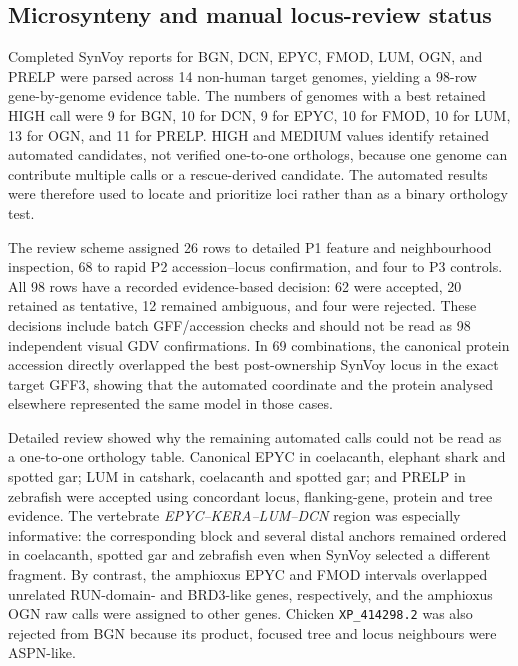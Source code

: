 \subsection{Microsynteny and manual locus-review status}
\label{subsec:results-synteny}

Completed SynVoy reports for BGN, DCN, EPYC, FMOD, LUM, OGN, and PRELP were
parsed across 14 non-human target genomes, yielding a 98-row gene-by-genome
evidence table. The numbers of genomes with a best retained HIGH call were 9
for BGN, 10 for DCN, 9 for EPYC, 10 for FMOD, 10 for LUM, 13 for OGN, and 11
for PRELP. HIGH and MEDIUM values identify retained automated candidates, not
verified one-to-one orthologs, because one genome can contribute multiple calls
or a rescue-derived candidate. The automated results were therefore used to
locate and prioritize loci rather than as a binary orthology test.

The review scheme assigned 26 rows to detailed P1 feature and neighbourhood
inspection, 68 to rapid P2 accession--locus confirmation, and four to P3
controls. All 98 rows have a recorded evidence-based decision: 62 were
accepted, 20 retained as tentative, 12 remained ambiguous, and four were
rejected. These decisions include batch GFF/accession checks and should not be
read as 98 independent visual GDV confirmations. In 69 combinations,
the canonical protein accession directly overlapped the best post-ownership
SynVoy locus in the exact target GFF3, showing that the automated coordinate
and the protein analysed elsewhere represented the same model in those cases.

Detailed review showed why the remaining automated calls could not be read as
a one-to-one orthology table. Canonical EPYC in coelacanth, elephant shark and
spotted gar; LUM in catshark, coelacanth and spotted gar; and PRELP in zebrafish
were accepted using concordant locus, flanking-gene, protein and tree evidence.
The vertebrate \textit{EPYC--KERA--LUM--DCN} region was especially informative:
the corresponding block and several distal anchors remained ordered in
coelacanth, spotted gar and zebrafish even when SynVoy selected a different
fragment. By contrast, the amphioxus EPYC and FMOD intervals overlapped
unrelated RUN-domain- and BRD3-like genes, respectively, and the amphioxus OGN
raw calls were assigned to other genes. Chicken \texttt{XP\_414298.2} was also
rejected from BGN because its product, focused tree and locus neighbours were
ASPN-like.


